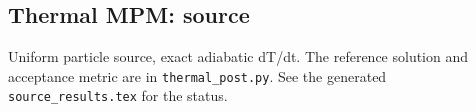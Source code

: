 \subsection{Thermal MPM: source}
Uniform particle source, exact adiabatic dT/dt. The reference solution and acceptance metric are in \texttt{thermal\_post.py}. See the generated \texttt{source\_results.tex} for the status.
